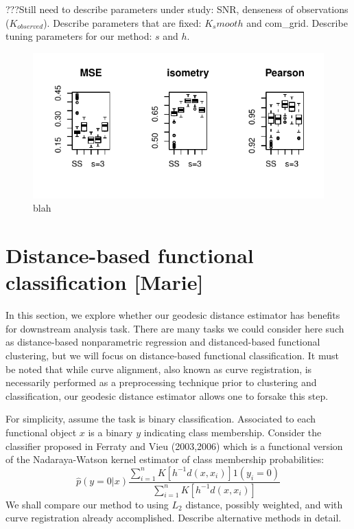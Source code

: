 ???Still need to describe parameters under study: SNR, denseness of
observations (\(K_{observed}\)). Describe parameters that are fixed:
\(K_smooth\) and com\_grid. Describe tuning parameters for our method:
\(s\) and \(h\).

\begin{figure}
\includegraphics{sim_results/sce=5_SNR=high_Kobs=30}
\caption{blah}
\end{figure}

\section{Distance-based functional classification
{[}Marie{]}}\label{distance-based-functional-classification-marie}

In this section, we explore whether our geodesic distance estimator has
benefits for downstream analysis task. There are many tasks we could
consider here such as distance-based nonparametric regression and
distanced-based functional clustering, but we will focus on
distance-based functional classification. It must be noted that while
curve alignment, also known as curve registration, is necessarily
performed as a preprocessing technique prior to clustering and
classification, our geodesic distance estimator allows one to forsake
this step.

For simplicity, assume the task is binary classification. Associated to
each functional object \(x\) is a binary \(y\) indicating class
membership. Consider the classifier proposed in Ferraty and Vieu
(2003,2006) which is a functional version of the Nadaraya-Watson kernel
estimator of class membership probabilities: \[
\hat p(y = 0 | x) \frac{ \sum_{i=1}^n K[h^{-1} d(x,x_i)] 1(y_i = 0) }{ \sum_{i=1}^n K[h^{-1} d(x,x_i)] }
\] We shall compare our method to using \(L_2\) distance, possibly
weighted, and with curve registration already accomplished. Describe
alternative methods in detail.

